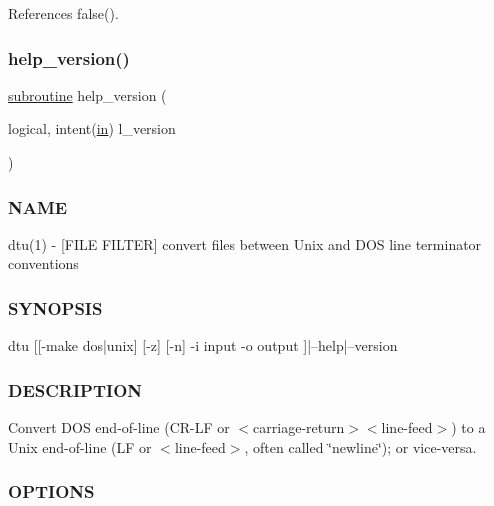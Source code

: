 References false().

\mbox{\label{dtu_8f90_a39c21619b08a3c22f19e2306efd7f766}} 
\subsubsection{\texorpdfstring{help\+\_\+version()}{help\_version()}}
{\footnotesize\ttfamily \hyperlink{M__stopwatch_83_8txt_acfbcff50169d691ff02d4a123ed70482}{subroutine} help\+\_\+version (\begin{DoxyParamCaption}\item[{logical, intent(\hyperlink{M__journal_83_8txt_afce72651d1eed785a2132bee863b2f38}{in})}]{l\+\_\+version }\end{DoxyParamCaption})}



\subsubsection*{N\+A\+ME}

dtu(1) -\/ \mbox{[}F\+I\+LE F\+I\+L\+T\+ER\mbox{]} convert files between Unix and D\+OS line terminator conventions 

\subsubsection*{S\+Y\+N\+O\+P\+S\+IS}

\begin{DoxyVerb}    dtu [[-make dos|unix] [-z] [-n] -i input -o output ]|--help|--version
\end{DoxyVerb}


\subsubsection*{D\+E\+S\+C\+R\+I\+P\+T\+I\+ON}

Convert D\+OS end-\/of-\/line (C\+R-\/\+LF or $<$carriage-\/return$>$$<$line-\/feed$>$) to a Unix end-\/of-\/line (LF or $<$line-\/feed$>$, often called \char`\"{}newline\char`\"{}); or vice-\/versa.

\subsubsection*{O\+P\+T\+I\+O\+NS}

